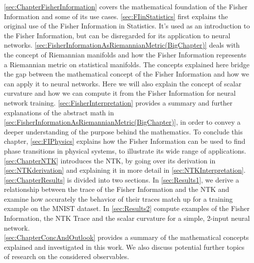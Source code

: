 \cref{sec:ChapterFisherInformation} covers the mathematical foundation of the Fisher Information and some of its use cases. \cref{sec:FIinStatistics} first explains the original use of the Fisher Information in Statistics. It's used as an introduction to the Fisher Information, but can be disregarded for its application to neural networks. \cref{sec:FisherInformationAsRiemannianMetric(BigChapter)} deals with the concept of Riemannian manifolds and how the Fisher Information represents a Riemannian metric on statistical manifolds. The concepts explained here bridge the gap between the mathematical concept of the Fisher Information and how we can apply it to neural networks. Here we will also explain the concept of scalar curvature and how we can compute it from the Fisher Information for neural network training. %
\cref{sec:FisherInterpretation} provides a summary and further explanations of the abstract math in \cref{sec:FisherInformationAsRiemannianMetric(BigChapter)}, in order to convey a deeper understanding of the purpose behind the mathematics. To conclude this chapter, \cref{sec:FIPhysics} explains how the Fisher Information can be used to find phase transitions in physical systems, to illustrate its wide range of applications.\\
\cref{sec:ChapterNTK} introduces the NTK, by going over its derivation in \cref{sec:NTKderivation} and explaining it in more detail in \cref{sec:NTKInterpretation}.\\
\cref{sec:ChapterResults} is divided into two sections. In \cref{sec:Results1}, we derive a relationship between the trace of the Fisher Information and the NTK and examine how accurately the behavior of their traces match up for a training example on the MNIST dataset. In \cref{sec:Results2} compute examples of the Fisher Information, the NTK Trace and the scalar curvature for a simple, 2-input neural network.\\
\cref{sec:ChapterConcAndOutlook} provides a summary of the mathematical concepts explained and investigated in this work. We also discuss potential further topics of research on the considered observables.